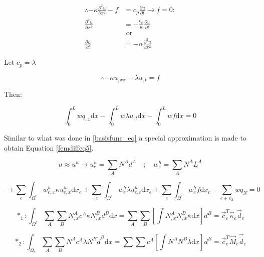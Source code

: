 \begin{equation}%
\begin{aligned}
\therefore -\kappa \frac{\partial^2 u}{\partial x^2} - f &= c_{\rho}\frac{\partial u}{\partial t} \rightarrow f=0:\\
\frac{\partial^2 u}{\partial x^2} &= - \frac{c_{\rho}}{\kappa} \frac{\partial u}{\partial t} \quad \\
&\text{ or } \\
\frac{\partial u}{\partial t} &= -\alpha \frac{\partial^2 u}{\partial x^2}
\end{aligned}
\end{equation}


Let $c_p = \lambda$ 

\begin{equation}%
\therefore -\kappa u_{,xx} - \lambda u_{,t} = f
\end{equation}


Then:

\begin{equation}%
\int_0^L w q_{,x} \text{d}x - \int_0^L w \lambda u_{,t} \text{d}x - \int_0^L w f \text{d}x = 0
\end{equation}


Similar to what was done in \ref{basisfunc_eq} a special approximation is made to obtain Equation \ref{femdiffeq5}.

\begin{equation}%
u \approx u^h \rightarrow u_e^h = \sum_{A}N^A d^A \quad;\quad w_e^h = \sum_{A}N^A L^A
\end{equation}


\begin{equation}%
\rightarrow \sum_e \int_{\Omega^e} w_{e,x}^h \kappa u_{e,x}^h \text{d}x_e + \sum_e \int_{\Omega^e} w_e^h \lambda u_{e,t}^h \text{d}x_e + \sum_e \int_{\Omega^e} w_e^h f \text{d}x_e - \sum_{e \in \epsilon_A} w q_N = 0
\end{equation}

\begin{equation*}
*_1: \int_{\Omega^e} \sum_A \sum_B N_{,x}^A c^A \kappa N_{,x}^B d^B \text{d}x = \sum_A\sum_B \left[ \int N_{,x}^A N_{,x}^B \kappa \text{d}x  \right]d^B = \vec{c}_e^T \vec{\kappa}_e \vec{d}_e
\end{equation*}


\begin{equation*}
*_2: \int_{\Omega_e} \sum_A \sum_B N^A c^A \lambda N^B \dot{d}^B \text{d}x = \sum\sum c^A \left[ \int N^A N^B \lambda \text{d}x \right] d^B = \vec{c}_e^T \vec{M}_e \vec{\dot{d}}_e
\end{equation*}


